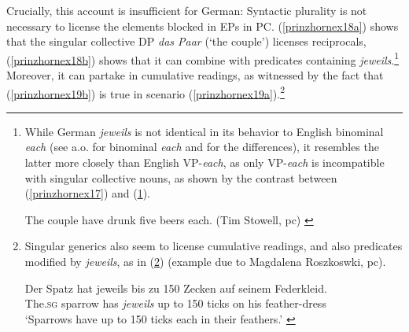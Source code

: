 \documentclass[output=paper,colorlinks,citecolor=brown,
]{langscibook}
\begin{document}
\z

Crucially, this account is insufficient for German: Syntactic plurality is not necessary to license the elements  blocked in EPs in PC. (\ref{prinzhornex18a}) shows that the singular collective DP {\it  das Paar} (`the couple') licenses reciprocals,  (\ref{prinzhornex18b}) shows that it can combine with predicates containing \textit{jeweils}.\footnote{While German  \textit{jeweils} is not identical in its behavior to English binominal  \textit{each} (see \citealt{Stowell:2013} a.o. for binominal \textit{each} and \citealt{Zimmermann:2002} for the differences), it resembles the latter more closely than English VP-\textit{each}, as only VP-\textit{each} is incompatible with singular collective nouns, as shown by the contrast between (\ref{prinzhornex17}) and (\ref{prinzhornfnnex5}).

\ea    The couple have drunk five beers each. \hfill (Tim Stowell, pc)  \label{prinzhornfnnex5} \z  

} Moreover, it can partake in cumulative readings, as witnessed by the fact that (\ref{prinzhornex19b}) is true in scenario (\ref{prinzhornex19a}).\footnote{Singular generics also seem to license cumulative readings,  and also predicates modified by \textit{jeweils}, as in (\ref{prinzhornexfn45}) (example due to Magdalena Roszkoswki, pc).

\ea 
\gll Der Spatz hat jeweils bis zu 150 Zecken auf seinem Federkleid.\\
The.\textsc{sg} sparrow has \textit{jeweils} up to 150 ticks on his feather-dress\\
\glt `Sparrows have up to 150 ticks each in their feathers.'
\label{prinzhornexfn45} 
\z

}
\end{document}
